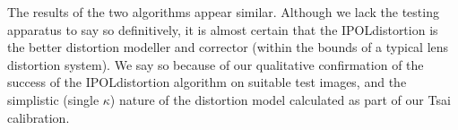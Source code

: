 The results of the two algorithms appear similar. Although we lack the testing apparatus to say so definitively, it is almost certain that the IPOLdistortion is the better distortion modeller and corrector (within the bounds of a typical lens distortion system). We say so because of our qualitative confirmation of the success of the IPOLdistortion algorithm on suitable test images, and the simplistic (single $\kappa$) nature of the distortion model calculated as part of our Tsai calibration.
